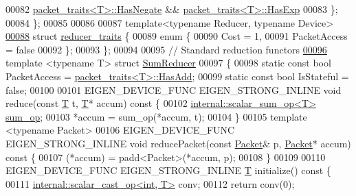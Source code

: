 \begin{DoxyCode}
00082                    \hyperlink{struct_eigen_1_1internal_1_1packet__traits}{packet\_traits<T>::HasNegate} && 
      \hyperlink{struct_eigen_1_1internal_1_1packet__traits}{packet\_traits<T>::HasExp}
00083   \};
00084 \};
00085 
00086 
00087 \textcolor{keyword}{template}<\textcolor{keyword}{typename} Reducer, \textcolor{keyword}{typename} Device>
\hyperlink{struct_eigen_1_1internal_1_1reducer__traits}{00088} \textcolor{keyword}{struct }\hyperlink{struct_eigen_1_1internal_1_1reducer__traits}{reducer\_traits} \{
00089   \textcolor{keyword}{enum} \{
00090     Cost = 1,
00091     PacketAccess = \textcolor{keyword}{false}
00092   \};
00093 \};
00094 
00095 \textcolor{comment}{// Standard reduction functors}
\hyperlink{struct_eigen_1_1internal_1_1_sum_reducer}{00096} \textcolor{keyword}{template} <\textcolor{keyword}{typename} T> \textcolor{keyword}{struct }\hyperlink{struct_eigen_1_1internal_1_1_sum_reducer}{SumReducer}
00097 \{
00098   \textcolor{keyword}{static} \textcolor{keyword}{const} \textcolor{keywordtype}{bool} PacketAccess = \hyperlink{struct_eigen_1_1internal_1_1packet__traits}{packet\_traits<T>::HasAdd};
00099   \textcolor{keyword}{static} \textcolor{keyword}{const} \textcolor{keywordtype}{bool} IsStateful = \textcolor{keyword}{false};
00100 
00101   EIGEN\_DEVICE\_FUNC EIGEN\_STRONG\_INLINE \textcolor{keywordtype}{void} reduce(\textcolor{keyword}{const} \hyperlink{group___sparse_core___module}{T} t, \hyperlink{group___sparse_core___module}{T}* accum)\textcolor{keyword}{ const }\{
00102     \hyperlink{struct_eigen_1_1internal_1_1scalar__sum__op}{internal::scalar\_sum\_op<T>} \hyperlink{struct_eigen_1_1internal_1_1sum__op}{sum\_op};
00103     *accum = sum\_op(*accum, t);
00104   \}
00105   \textcolor{keyword}{template} <\textcolor{keyword}{typename} Packet>
00106   EIGEN\_DEVICE\_FUNC EIGEN\_STRONG\_INLINE \textcolor{keywordtype}{void} reducePacket(\textcolor{keyword}{const} \hyperlink{union_eigen_1_1internal_1_1_packet}{Packet}& p, 
      \hyperlink{union_eigen_1_1internal_1_1_packet}{Packet}* accum)\textcolor{keyword}{ const }\{
00107     (*accum) = padd<Packet>(*accum, p);
00108   \}
00109 
00110   EIGEN\_DEVICE\_FUNC EIGEN\_STRONG\_INLINE \hyperlink{group___sparse_core___module}{T} initialize()\textcolor{keyword}{ const }\{
00111     \hyperlink{struct_eigen_1_1internal_1_1scalar__cast__op}{internal::scalar\_cast\_op<int, T>} conv;
00112     \textcolor{keywordflow}{return} conv(0);

\end{DoxyCode}
